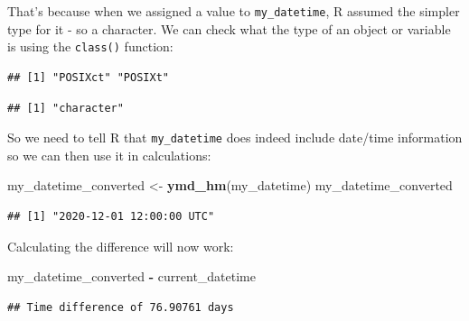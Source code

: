 \documentclass[
  12pt,
  krantz2]{krantz}
\makeatletter
\newenvironment{Shaded}{\begin{snugshade}}{\end{snugshade}}
\newcommand{\KeywordTok}[1]{\textcolor[rgb]{0.13,0.29,0.53}{\textbf{#1}}}
\newcommand{\NormalTok}[1]{#1}
\newcommand{\OperatorTok}[1]{\textcolor[rgb]{0.81,0.36,0.00}{\textbf{#1}}}
\newcommand{\StringTok}[1]{\textcolor[rgb]{0.31,0.60,0.02}{#1}}
\newenvironment{kframe}{%
\medskip{}
\setlength{\fboxsep}{.8em}
 \def\at@end@of@kframe{}%
 \ifinner\ifhmode%
  \def\at@end@of@kframe{\end{minipage}}%
  \begin{minipage}{\columnwidth}%
 \fi\fi%
 \def\FrameCommand##1{\hskip\@totalleftmargin \hskip-\fboxsep
 \colorbox{shadecolor}{##1}\hskip-\fboxsep
     \hskip-\linewidth \hskip-\@totalleftmargin \hskip\columnwidth}%
 \MakeFramed {\advance\hsize-\width
   \@totalleftmargin\z@ \linewidth\hsize
   \@setminipage}}%
 {\par\unskip\endMakeFramed%
 \at@end@of@kframe}
\renewenvironment{Shaded}{\begin{kframe}}{\end{kframe}}
\makeatother
\begin{document}
That's because when we assigned a value to \texttt{my\_datetime}, R assumed the simpler type for it - so a character.
We can check what the type of an object or variable is using the \texttt{class()} function:

\begin{Shaded}
\end{Shaded}

\begin{verbatim}
## [1] "POSIXct" "POSIXt"
\end{verbatim}

\begin{Shaded}
\end{Shaded}

\begin{verbatim}
## [1] "character"
\end{verbatim}

So we need to tell R that \texttt{my\_datetime} does indeed include date/time information so we can then use it in calculations:

\begin{Shaded}
\begin{Highlighting}[]
\NormalTok{my_datetime_converted <-}\StringTok{ }\KeywordTok{ymd_hm}\NormalTok{(my_datetime)}
\NormalTok{my_datetime_converted}
\end{Highlighting}
\end{Shaded}

\begin{verbatim}
## [1] "2020-12-01 12:00:00 UTC"
\end{verbatim}

Calculating the difference will now work:

\begin{Shaded}
\begin{Highlighting}[]
\NormalTok{my_datetime_converted }\OperatorTok{-}\StringTok{ }\NormalTok{current_datetime}
\end{Highlighting}
\end{Shaded}

\begin{verbatim}
## Time difference of 76.90761 days
\end{verbatim}
\end{document}
